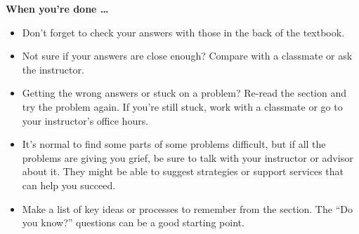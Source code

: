 \bigskip

\noindent \textbf{When you're done \ldots}

\begin{itemize}
\item Don't forget to check your answers with those in the back of the textbook. 
\item Not sure if your answers are close enough? Compare with a classmate or ask the instructor.  
\item Getting the wrong answers or stuck on a problem?  Re-read the section and try the problem again.  If you're still stuck, work with a classmate or go to your instructor's office hours.
\item It's normal to find some parts of some problems difficult, but if all the problems are giving you grief, be sure to talk with your instructor or advisor about it.  They might be able to suggest strategies or support services that can help you succeed.
\item Make a list of key ideas or processes to remember from the section.  The ``Do you know?'' questions can be a good starting point.
\end{itemize}



